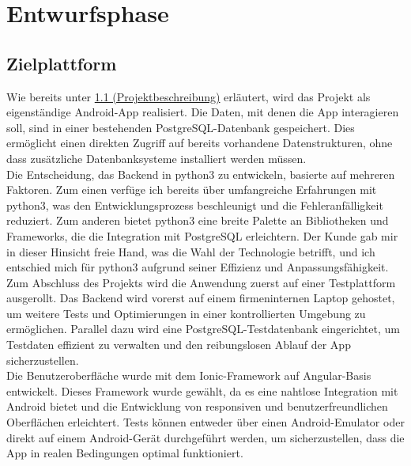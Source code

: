 \documentclass[a4paper,12pt]{article}
\begin{document}
\section{Entwurfsphase}
\subsection{Zielplattform}
Wie bereits unter \hyperref[sec:projektbeschreibung]{1.1 (Projektbeschreibung)} erläutert, wird das Projekt als eigenständige Android-App realisiert. Die Daten, mit denen die App interagieren soll, sind in einer bestehenden PostgreSQL-Datenbank gespeichert. Dies ermöglicht einen direkten Zugriff auf bereits vorhandene Datenstrukturen, ohne dass zusätzliche Datenbanksysteme installiert werden müssen.\\
Die Entscheidung, das Backend in \acrshort{python3} zu entwickeln, basierte auf mehreren Faktoren. Zum einen verfüge ich bereits über umfangreiche Erfahrungen mit \acrshort{python3}, was den Entwicklungsprozess beschleunigt und die Fehleranfälligkeit reduziert. Zum anderen bietet \acrshort{python3} eine breite Palette an Bibliotheken und Frameworks, die die Integration mit PostgreSQL erleichtern. Der Kunde gab mir in dieser Hinsicht freie Hand, was die Wahl der Technologie betrifft, und ich entschied mich für \acrshort{python3} aufgrund seiner Effizienz und Anpassungsfähigkeit.\\
Zum Abschluss des Projekts wird die Anwendung zuerst auf einer Testplattform ausgerollt. Das Backend wird vorerst auf einem firmeninternen Laptop gehostet, um weitere Tests und Optimierungen in einer kontrollierten Umgebung zu ermöglichen. Parallel dazu wird eine PostgreSQL-Testdatenbank eingerichtet, um Testdaten effizient zu verwalten und den reibungslosen Ablauf der App sicherzustellen.\\
Die Benutzeroberfläche wurde mit dem Ionic-Framework auf Angular-Basis entwickelt. Dieses Framework wurde gewählt, da es eine nahtlose Integration mit Android bietet und die Entwicklung von responsiven und benutzerfreundlichen Oberflächen erleichtert. Tests können entweder über einen Android-Emulator oder direkt auf einem Android-Gerät durchgeführt werden, um sicherzustellen, dass die App in realen Bedingungen optimal funktioniert.
\end{document}
